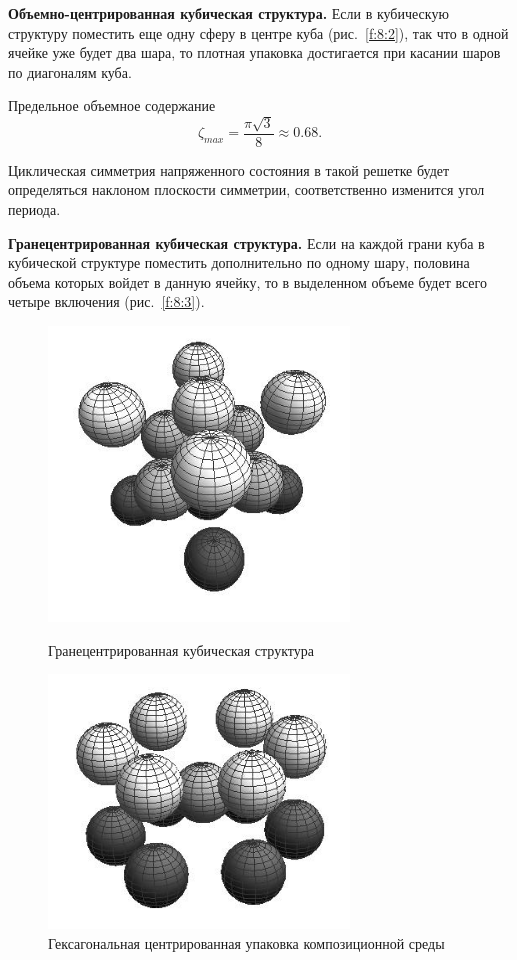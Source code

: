 \textbf{Объемно-центрированная кубическая структура.} Если в кубическую структуру поместить еще одну сферу в центре куба (рис.~\ref{f:8:2}), так что в одной ячейке уже будет два шара, то плотная упаковка достигается при касании шаров по диагоналям куба.{\sloppy\par}


Предельное объемное содержание
$$
\zeta_{max}=\frac{\pi\sqrt{3}}{8}\approx 0.68.
$$

Циклическая симметрия напряженного состояния в такой решетке будет определяться наклоном плоскости симметрии, соответственно изменится угол периода.

\textbf{Гранецентрированная кубическая структура.} Если на каждой грани куба в кубической структуре поместить дополнительно по одному шару, половина объема которых войдет в данную ячейку, то в выделенном объеме будет всего четыре включения (рис.~\ref{f:8:3}).

\begin{figure}[h!]
\centering\footnotesize
\parbox[b]{7.5cm}{\centering\includegraphics[width=8cm]{cav-14.jpg}
\caption{Гранецентрированная кубическая структура
\label{f:8:3}}}\hfil\hfil
\parbox[b]{7.5cm}{\centering\includegraphics[width=8cm]{cav-13.jpg}
\caption{Гексагональная центрированная упаковка композиционной среды
\label{f:8:4}}}
\end{figure}


